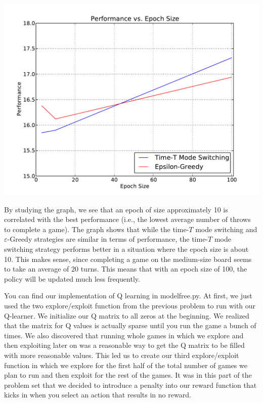 \documentclass[solution, letterpaper]{cs121}
\begin{document}
\begin{center}
\includegraphics[scale=0.8]{source/perf-v-epoch-size.pdf}
\end{center}

By studying the graph, we see that an epoch of size approximately 10 is correlated with the best performance (i.e., the lowest average number of throws to complete a game). The graph shows that while the time-$T$ mode switching and $\varepsilon$-Greedy strategies are similar in terms of performance, the time-$T$ mode switching strategy performs better in a situation where the epoch size is about 10. This makes sense, since completing a game on the medium-size board seems to take an average of 20 turns. This means that with an epoch size of 100, the policy will be updated much less frequently. 

\subproblem{} %
You can find our implementation of Q learning in modelfree.py. At first, we just used the two explore/exploit function from the previous problem to run with our Q-learner. We initialize our Q matrix to all zeros at the beginning. We realized that the matrix for Q values is actually sparse until you run the game a bunch of times. We also discovered that running whole games in which we explore and then exploiting later on was a reasonable way to get the Q matrix to be filled with more reasonable values. This led us to create our third explore/exploit function in which we explore for the first half of the total number of games we plan to run and then exploit for the rest of the games.  It was in this part of the problem set that we decided to introduce a penalty into our reward function that kicks in when you select an action that results in no reward.
\end{document}
